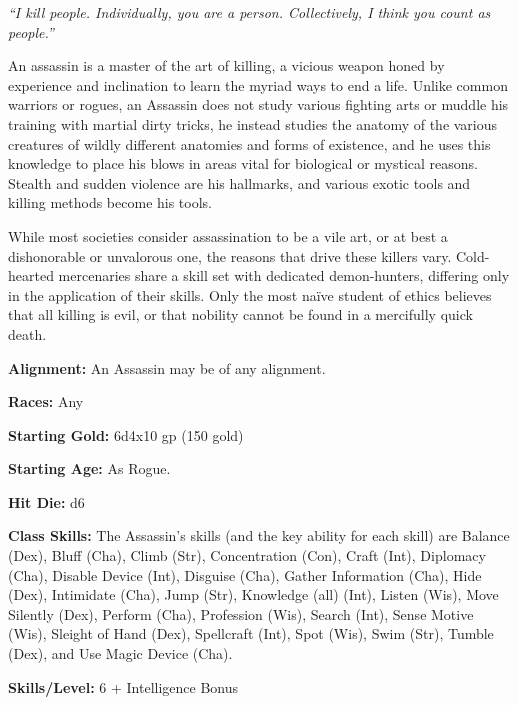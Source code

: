 \documentclass[10pt]{article}
\newcommand{\ability}[2]{\smallskip \noindent \textbf{#1} #2}
\newcommand{\classname}[1]{\noindent{\huge \textbf{#1}}}
\newcommand{\quot}[1]{\emph{#1}\medskip}
\newcommand{\desc}[1]{#1 \medskip}
\begin{document}

\classname{Assassin}

\quot{``I kill people. Individually, you are a person. Collectively, I think you count as people.''}

\desc{An assassin is a master of the art of killing, a vicious weapon honed by experience and inclination to learn the myriad ways to end a life. Unlike common warriors or rogues, an Assassin does not study various fighting arts or muddle his training with martial dirty tricks, he instead studies the anatomy of the various creatures of wildly different anatomies and forms of existence, and he uses this knowledge to place his blows in areas vital for biological or mystical reasons. Stealth and sudden violence are his hallmarks, and various exotic tools and killing methods become his tools.}

\desc{While most societies consider assassination to be a vile art, or at best a dishonorable or unvalorous one, the reasons that drive these killers vary. Cold-hearted mercenaries share a skill set with dedicated demon-hunters, differing only in the application of their skills. Only the most na\"ive student of ethics believes that all killing is evil, or that nobility cannot be found in a mercifully quick death.}

\ability{Alignment:}{An Assassin may be of any alignment.}

\ability{Races:}{Any}

\ability{Starting Gold:}{6d4x10 gp (150 gold)}

\ability{Starting Age:}{As Rogue.}

\ability{Hit Die:}{d6}

\ability{Class Skills:}{The Assassin's skills (and the key ability for each skill) are Balance (Dex), Bluff (Cha), Climb (Str), Concentration (Con), Craft (Int), Diplomacy (Cha), Disable Device (Int), Disguise (Cha), Gather Information (Cha), Hide (Dex), Intimidate (Cha), Jump (Str), Knowledge (all) (Int), Listen (Wis), Move Silently (Dex), Perform (Cha), Profession (Wis), Search (Int), Sense Motive (Wis), Sleight of Hand (Dex), Spellcraft (Int), Spot (Wis), Swim (Str), Tumble (Dex), and Use Magic Device (Cha).}

\ability{Skills/Level:}{6 + Intelligence Bonus}
\end{document}

